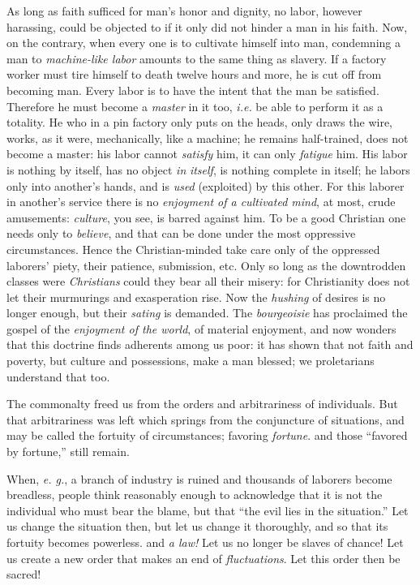 \documentclass[12pt,a4paper]{book}
\begin{document}
As long as faith sufficed for man's honor and dignity, no labor, however 
harassing, could be objected to if it only did not hinder a man in his faith. 
Now, on the contrary, when every one is to cultivate himself into man, 
condemning a man to \textit{machine-like labor} amounts to the same thing as 
slavery. If a factory worker must tire himself to death twelve hours and more, 
he is cut off from becoming man. Every labor is to have the intent that the 
man be satisfied. Therefore he must become a \textit{master} in it too, 
\textit{i.e.} be able to perform it as a totality. He who in a pin factory 
only puts on the heads, only draws the wire, works, as it were, mechanically, 
like a machine; he remains half-trained, does not become a master: his labor 
cannot \textit{satisfy} him, it can only \textit{fatigue} him. His labor is 
nothing by itself, has no object \textit{in} \textit{itself}, is nothing 
complete in itself; he labors only into another's hands, and is \textit{used} 
(exploited) by this other. For this laborer in another's service there is no 
\textit{enjoyment of a cultivated mind}, at most, crude amusements: 
\textit{culture}, you see, is barred against him. To be a good Christian one 
needs only to \textit{believe}, and that can be done under the most oppressive 
circumstances. Hence the Christian-minded take care only of the oppressed 
laborers' piety, their patience, submission, etc. Only so long as the 
downtrodden classes were \textit{Christians} could they bear all their misery: 
for Christianity does not let their murmurings and exasperation rise. Now the 
\textit{hushing} of desires is no longer enough, but their \textit{sating} is 
demanded. The \textit{bourgeoisie} has proclaimed the gospel of the 
\textit{enjoyment of the world}, of material enjoyment, and now wonders that 
this doctrine finds adherents among us poor: it has shown that not faith and 
poverty, but culture and possessions, make a man blessed; we proletarians 
understand that too.

The commonalty freed us from the orders and arbitrariness of individuals. But 
that arbitrariness was left which springs from the conjuncture of situations, 
and may be called the fortuity of circumstances; favoring \textit{fortune}. 
and those ``favored by fortune,'' still remain.

When, \textit{e. g.}, a branch of industry is ruined and thousands of laborers 
become breadless, people think reasonably enough to acknowledge that it is not 
the individual who must bear the blame, but that ``the evil lies in the 
situation.'' Let us change the situation then, but let us change it 
thoroughly, and so that its fortuity becomes powerless. and \textit{a law!} 
Let us no longer be slaves of chance! Let us create a new order that makes an 
end of \textit{fluctuations}. Let this order then be sacred!
\end{document}
